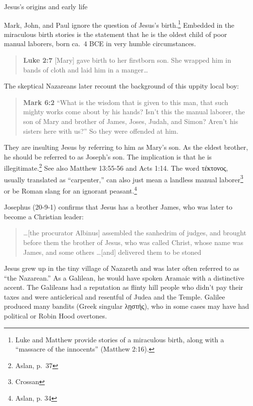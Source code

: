 \documentclass[8pt]{article}
\newcommand{\quotesize}{\large{}}
\newenvironment{quotetext}{\begin{quote}\quotesize}{\end{quote}}
\newcommand{\bible}[2]{\begin{quotetext}\textbf{#1} #2\end{quotetext}}
\newcommand{\gospelmark}[2]{\bible{Mark #1}{#2}}
\newcommand{\luke}[2]{\bible{Luke #1}{#2}}
\begin{document}
\begin{section}{Jesus's origins and early life}

Mark, John, and Paul ignore the question of Jesus's birth.\footnote{Luke and Matthew provide stories of a miraculous birth,
along with a ``massacre of the innocents'' (Matthew 2:16).} Embedded in the miraculous birth stories is the statement
that he is the oldest child of poor manual laborers, born ca.~4 BCE in
very humble circumstances.

\luke{2:7}{[Mary] gave birth to her firstborn son. She wrapped him in bands of cloth and laid him in a manger\ldots}

The skeptical Nazareans later recount the background of this uppity local boy:

\gospelmark{6:2}{``What is the wisdom that is given to this man, that such
mighty works come about by his hands? Isn’t this the manual laborer, the
son of Mary and brother of James, Joses, Judah, and Simon? Aren’t his
sisters here with us?'' So they were offended at him.}

They are insulting Jesus by referring to him as Mary's son. As the eldest brother, he should be referred to as Joseph's son.
The implication is that he is illegitimate.\footnote{Aslan, p.~37}  See also Matthew 13:55-56 and Acts 1:14. 
The word τέκτονος, usually translated as ``carpenter,'' can also just mean a landless manual laborer\footnote{Crossan}
or be Roman slang for an ignorant peasant.\footnote{Aslan, p. 34} 

Josephus (20-9-1) confirms that Jesus has a brother James, who was later to become a Christian leader:

\begin{quotetext} %
\ldots [the procurator Albinus] assembled the sanhedrim of judges, and brought before them the brother of Jesus, who was called Christ, whose name was James, and some others \ldots [and] delivered them to be stoned
\end{quotetext}

Jesus grew up in the tiny village of Nazareth and was later often referred
to as ``the Nazarean.'' As a Galilean, he would have spoken Aramaic
with a distinctive accent.  The Galileans had a reputation as
flinty hill people who didn't pay their taxes and were
anticlerical and resentful of Judea and the Temple.  Galilee produced
many bandits (Greek singular λῃστής), who in some cases may have had
political or Robin Hood overtones.


\end{section}
\end{document}
